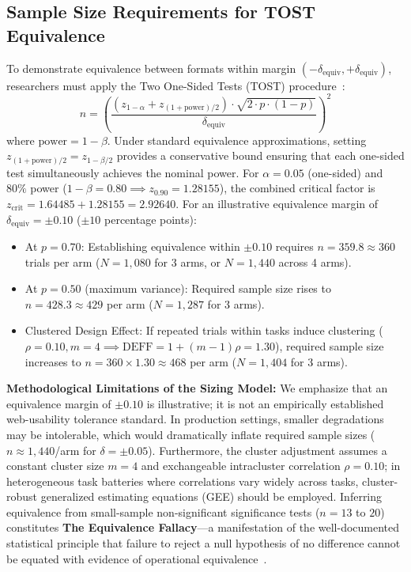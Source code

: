 \documentclass[11pt,a4paper]{article}
\begin{document}
\subsection{Sample Size Requirements for TOST Equivalence}
\label{sec:tost}
To demonstrate equivalence between formats within margin $(-\delta_{\text{equiv}}, +\delta_{\text{equiv}})$, researchers must apply the Two One-Sided Tests (TOST) procedure~\cite{schuirmann1987comparison}:
\begin{equation}
n = \left(\frac{(z_{1-\alpha} + z_{(1+\text{power})/2}) \cdot \sqrt{2 \cdot p \cdot (1 - p)}}{\delta_{\text{equiv}}}\right)^2
\end{equation}
where $\text{power} = 1 - \beta$. Under standard equivalence approximations, setting $z_{(1+\text{power})/2} = z_{1 - \beta/2}$ provides a conservative bound ensuring that each one-sided test simultaneously achieves the nominal power. For $\alpha = 0.05$ (one-sided) and $80\%$ power ($1-\beta = 0.80 \implies z_{0.90} = 1.28155$), the combined critical factor is $z_{\text{crit}} = 1.64485 + 1.28155 = 2.92640$. For an illustrative equivalence margin of $\delta_{\text{equiv}} = \pm 0.10$ ($\pm 10$ percentage points):
\begin{itemize}
    \item At $p = 0.70$: Establishing equivalence within $\pm 0.10$ requires $n = 359.8 \approx 360$ trials per arm ($N = 1,080$ for 3 arms, or $N = 1,440$ across 4 arms).
    \item At $p = 0.50$ (maximum variance): Required sample size rises to $n = 428.3 \approx 429$ per arm ($N = 1,287$ for 3 arms).
    \item Clustered Design Effect: If repeated trials within tasks induce clustering ($\rho = 0.10, m = 4 \implies \text{DEFF} = 1 + (m-1)\rho = 1.30$), required sample size increases to $n = 360 \times 1.30 \approx 468$ per arm ($N = 1,404$ for 3 arms).
\end{itemize}
\textbf{Methodological Limitations of the Sizing Model:} We emphasize that an equivalence margin of $\pm 0.10$ is illustrative; it is not an empirically established web-usability tolerance standard. In production settings, smaller degradations may be intolerable, which would dramatically inflate required sample sizes ($n \approx 1,440$/arm for $\delta = \pm 0.05$). Furthermore, the cluster adjustment assumes a constant cluster size $m=4$ and exchangeable intracluster correlation $\rho = 0.10$; in heterogeneous task batteries where correlations vary widely across tasks, cluster-robust generalized estimating equations (GEE) should be employed. Inferring equivalence from small-sample non-significant significance tests ($n=13$ to $20$) constitutes \textbf{The Equivalence Fallacy}---a manifestation of the well-documented statistical principle that failure to reject a null hypothesis of no difference cannot be equated with evidence of operational equivalence~\cite{schuirmann1987comparison, agresti2002categorical}.
\end{document}
